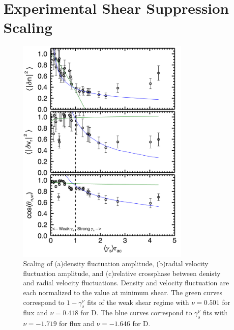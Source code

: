 \documentclass[aip,pop,amsmath,amssymb,preprint,superscriptaddress]{revtex4-1} %
\begin{document}
\section{Experimental Shear Suppression Scaling}

\begin{figure}[!htbp]
\centerline{
\includegraphics[width=8.5cm]{densvrcp}}
\caption{\label{fig:densvrcp} Scaling of (a)density fluctuation amplitude, (b)radial velocity fluctuation amplitude, and (c)relative crossphase between denisty and radial velocity fluctuations. Density and velocity fluctuation are each normalized to the value at minimum shear. The green curves correspond to $1-\gamma_{s}^{\nu}$ fits of the weak shear regime with $\nu = 0.501$ for flux and $\nu = 0.418$ for D. The blue curves correspond to $\gamma_{s}^{\nu}$ fits with $\nu = -1.719$ for flux and $\nu = -1.646$ for D.}
\end{figure}
\end{document}
